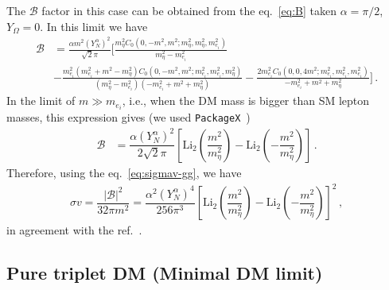 \documentclass[12pt,letterpaper]{article}
\begin{document}
The $\mathcal{B}$ factor in this case can be obtained from the eq.~\ref{eq:B} taken $\alpha =\pi/2$, $Y_{\Omega}=0$. In this limit we have
\begin{align}
\mathcal{B} &=
\frac{\alpha  m^2 (Y_N^{\alpha })^2}{\sqrt{2} \pi }\bigg[
\frac{m_{\eta }^2 C_0\left(0,-m^2,m^2;m_{\eta }^2,m_{\eta }^2,m_{e_i}^2\right)}{m_{\eta }^2-m_{e_i}^2}\nonumber\\
&-\frac{m_{e_i}^2 \left(m_{e_i}^2+m^2-m_{\eta }^2\right) C_0\left(0,-m^2,m^2;m_{e_i}^2,m_{e_i}^2,m_{\eta
   }^2\right)}{\left(m_{\eta }^2-m_{e_i}^2\right) \left(-m_{e_i}^2+m^2+m_{\eta }^2\right)}-\frac{2 m_{e_i}^2 C_0\left(0,0,4 m^2;m_{e_i}^2,m_{e_i}^2,m_{e_i}^2\right)}{-m_{e_i}^2+m^2+m_{\eta }^2}\bigg]\,.
\end{align}
In the limit of $m\gg m_{e_i}$, i.e., when the DM mass is bigger than  SM lepton masses, this expression gives (we used \texttt{PackageX}~\cite{Patel:2015tea})
\begin{align}
\mathcal{B} &=
\dfrac{\alpha(Y_N^{\alpha })^2}{2\sqrt{2}\pi}
\left[\text{Li}_2\left(\dfrac{m^2}{m_{\eta}^2}\right)-\text{Li}_2\left(-\dfrac{m^2}{m_{\eta}^2}\right)\right]\,.
\end{align}
Therefore, using the eq.~\ref{eq:sigmav-gg}, we have
\begin{align}
\sigma v = \dfrac{|\mathcal{B}|^2}{32\pi m^2}=\dfrac{\alpha^2(Y_N^{\alpha })^4}{256\pi^3}\left[\text{Li}_2\left(\dfrac{m^2}{m_{\eta}^2}\right)-\text{Li}_2\left(-\dfrac{m^2}{m_{\eta}^2}\right)\right]^2\,,
\end{align}
in agreement with the ref.~\cite{Garny:2015wea}.



\subsection{Pure triplet DM (Minimal DM limit)}
\label{sec:pure-triplet-sigmagg}
\end{document}
